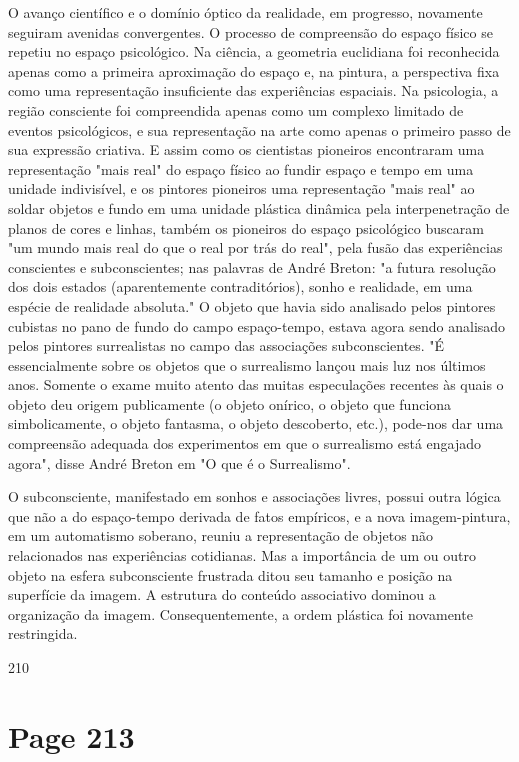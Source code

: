 \documentclass[a4paper]{article}
\begin{document}
O avanço científico e o domínio óptico da realidade, em progresso, novamente seguiram avenidas convergentes. O processo de compreensão do espaço físico se repetiu no espaço psicológico. Na ciência, a geometria euclidiana foi reconhecida apenas como a primeira aproximação do espaço e, na pintura, a perspectiva fixa como uma representação insuficiente das experiências espaciais. Na psicologia, a região consciente foi compreendida apenas como um complexo limitado de eventos psicológicos, e sua representação na arte como apenas o primeiro passo de sua expressão criativa. E assim como os cientistas pioneiros encontraram uma representação "mais real" do espaço físico ao fundir espaço e tempo em uma unidade indivisível, e os pintores pioneiros uma representação "mais real" ao soldar objetos e fundo em uma unidade plástica dinâmica pela interpenetração de planos de cores e linhas, também os pioneiros do espaço psicológico buscaram "um mundo mais real do que o real por trás do real", pela fusão das experiências conscientes e subconscientes; nas palavras de André Breton: "a futura resolução dos dois estados (aparentemente contraditórios), sonho e realidade, em uma espécie de realidade absoluta." O objeto que havia sido analisado pelos pintores cubistas no pano de fundo do campo espaço-tempo, estava agora sendo analisado pelos pintores surrealistas no campo das associações subconscientes. "É essencialmente sobre os objetos que o surrealismo lançou mais luz nos últimos anos. Somente o exame muito atento das muitas especulações recentes às quais o objeto deu origem publicamente (o objeto onírico, o objeto que funciona simbolicamente, o objeto fantasma, o objeto descoberto, etc.), pode-nos dar uma compreensão adequada dos experimentos em que o surrealismo está engajado agora", disse André Breton em "O que é o Surrealismo".

O subconsciente, manifestado em sonhos e associações livres, possui outra lógica que não a do espaço-tempo derivada de fatos empíricos, e a nova imagem-pintura, em um automatismo soberano, reuniu a representação de objetos não relacionados nas experiências cotidianas. Mas a importância de um ou outro objeto na esfera subconsciente frustrada ditou seu tamanho e posição na superfície da imagem. A estrutura do conteúdo associativo dominou a organização da imagem. Consequentemente, a ordem plástica foi novamente restringida.

\vspace*{\fill}
210

\newpage
\section*{Page 213}
\end{document}
